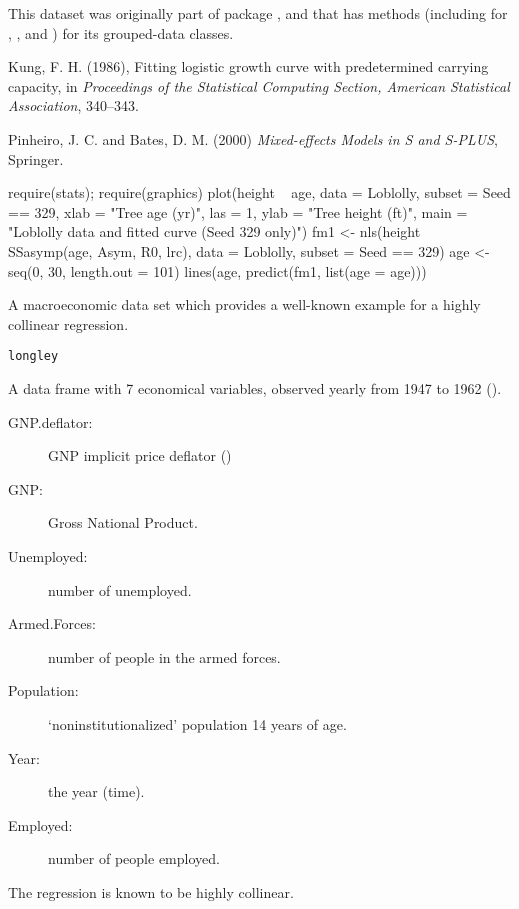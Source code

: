 %
\begin{Details}\relax
   
This dataset was originally part of package , and that has
methods (including for \code{[}, ,  and
) for its grouped-data classes. 
\end{Details}
%
\begin{Source}\relax
Kung, F. H. (1986),
Fitting logistic growth curve with predetermined carrying capacity,
in \emph{Proceedings of the Statistical Computing Section,
American Statistical Association}, 340--343.

Pinheiro, J. C. and Bates, D. M. (2000)
\emph{Mixed-effects Models in S and S-PLUS}, Springer.
\end{Source}
%
\begin{Examples}
\begin{ExampleCode}
require(stats); require(graphics)
plot(height ~ age, data = Loblolly, subset = Seed == 329,
     xlab = "Tree age (yr)", las = 1,
     ylab = "Tree height (ft)",
     main = "Loblolly data and fitted curve (Seed 329 only)")
fm1 <- nls(height ~ SSasymp(age, Asym, R0, lrc),
           data = Loblolly, subset = Seed == 329)
age <- seq(0, 30, length.out = 101)
lines(age, predict(fm1, list(age = age)))
\end{ExampleCode}
\end{Examples}
%
\begin{Description}\relax
A macroeconomic data set which provides a well-known example for a
highly collinear regression.
\end{Description}
%
\begin{Usage}
\begin{verbatim}
longley
\end{verbatim}
\end{Usage}
%
\begin{Format}
A data frame with 7 economical variables, observed yearly from 1947 to
1962 ().
\begin{description}

\item[GNP.deflator:] GNP implicit price deflator ()
\item[GNP:] Gross National Product.
\item[Unemployed:] number of unemployed.
\item[Armed.Forces:] number of people in the armed forces.
\item[Population:] `noninstitutionalized' population
\eqn{\ge}{} 14 years of age.
\item[Year:] the year (time).
\item[Employed:] number of people employed.

\end{description}


The regression  is known to be highly
collinear.
\end{Format}
